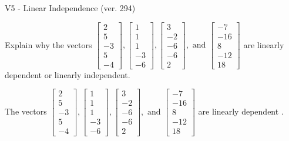 \begin{exercise}
  \begin{exerciseTitle}V5 - Linear Independence (ver. 294)\end{exerciseTitle}
  \begin{exerciseStatement}
    Explain why the vectors \(\left[\begin{array}{r}
2 \\
5 \\
-3 \\
5 \\
-4
\end{array}\right] , \left[\begin{array}{r}
1 \\
1 \\
1 \\
-3 \\
-6
\end{array}\right] , \left[\begin{array}{r}
3 \\
-2 \\
-6 \\
-6 \\
2
\end{array}\right] , \text{ and } \left[\begin{array}{r}
-7 \\
-16 \\
8 \\
-12 \\
18
\end{array}\right]\) are linearly dependent or linearly independent.	


  \end{exerciseStatement}
  \begin{exerciseAnswer}
   The vectors \(\left[\begin{array}{r}
2 \\
5 \\
-3 \\
5 \\
-4
\end{array}\right] , \left[\begin{array}{r}
1 \\
1 \\
1 \\
-3 \\
-6
\end{array}\right] , \left[\begin{array}{r}
3 \\
-2 \\
-6 \\
-6 \\
2
\end{array}\right] , \text{ and } \left[\begin{array}{r}
-7 \\
-16 \\
8 \\
-12 \\
18
\end{array}\right]\) are 
  	 linearly dependent  .
  


  \end{exerciseAnswer}
\end{exercise}